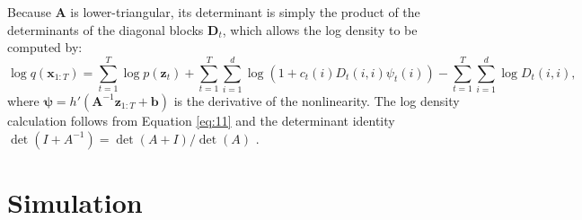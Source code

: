 \documentclass[11pt,a4paper]{article}
\begin{document}
Because $\mathbf{A}$ is lower-triangular, its determinant is simply the product of the determinants of the diagonal blocks $\mathbf{D}_t$, which allows the log density to be computed by:
\begin{equation}
\log q(\mathbf{x}_{1:T}) = \sum_{t=1}^T \log p(\mathbf{z}_t) + \sum_{t=1}^T \sum_{i=1}^d \log (1 + c_t(i) D_{t}(i, i) \psi_{t}(i)) - \sum_{t=1}^T \sum_{i=1}^d \log D_{t}(i, i),
\end{equation}
where $\mathbf{\psi} = h'(\mathbf{A}^{-1}\mathbf{z}_{1:T} + \mathbf{b})$ is the derivative of the nonlinearity. The log density calculation follows from Equation \ref{eq:11} and the determinant identity $\det(I + A^{-1}) = \det(A + I) / \det(A)$ \cite{razaghi2019filtering}.

\section{Simulation}




\newpage


\end{document}
